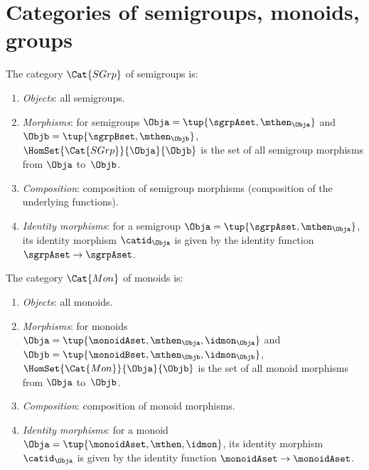 
\section[Categories of semigroups, monoids, groups]{Categories of semigroups, monoids, groups}
\label{sec:cats-of-semigroups-monoids-groups}



\begin{ctdefinition}
    \label{def:SGrp}
    The category $\Cat{SGrp}$ of semigroups is:
    \begin{enumerate}
        \item \emph{Objects}: all semigroups.
        \item \emph{Morphisms}: for semigroups $\Obja = \tup{\sgrpAset, \mthen_\Obja}$ and $\Objb = \tup{\sgrpBset, \mthen_\Objb}$,  $\HomSet{\Cat{SGrp}}{\Obja}{\Objb}$ is the set of all semigroup morphisms from $\Obja$ to~$\Objb$.
        \item \emph{Composition}: composition of semigroup morphisms (composition of the underlying functions).
        \item \emph{Identity morphisms}: for a semigroup $\Obja = \tup{\sgrpAset, \mthen_\Obja}$, its identity morphism $\catid_\Obja$ is given by the identity function $\sgrpAset \to \sgrpAset$.
    \end{enumerate}
\end{ctdefinition}




\begin{ctdefinition}
    \label{def:Mon}
    The category $\Cat{Mon}$ of monoids is:
    \begin{enumerate}
        \item \emph{Objects}: all monoids.
        \item \emph{Morphisms}: for monoids $\Obja = \tup{\monoidAset, \mthen_\Obja, \idmon_\Obja}$ and $\Objb = \tup{\monoidBset, \mthen_\Objb, \idmon_\Objb}$,  \linebreak $\HomSet{\Cat{Mon}}{\Obja}{\Objb}$ is the set of all monoid morphisms from $\Obja$ to~$\Objb$.
        \item \emph{Composition}: composition of monoid morphisms.
        \item \emph{Identity morphisms}: for a monoid $\Obja = \tup{\monoidAset, \mthen, \idmon}$, its identity morphism $\catid_\Obja$ is given by the identity function $\monoidAset \to \monoidAset$.
    \end{enumerate}
\end{ctdefinition}


